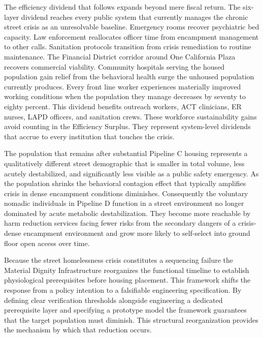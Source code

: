 \documentclass[12pt, letterpaper]{article}
\begin{document}
The efficiency dividend that follows expands beyond mere fiscal return. The six-layer dividend reaches every public system that currently manages the chronic street crisis as an unresolvable baseline. Emergency rooms recover psychiatric bed capacity. Law enforcement reallocates officer time from encampment management to other calls. Sanitation protocols transition from crisis remediation to routine maintenance. The Financial District corridor around One California Plaza recovers commercial viability. Community hospitals serving the housed population gain relief from the behavioral health surge the unhoused population currently produces. Every front line worker experiences materially improved working conditions when the population they manage decreases by seventy to eighty percent. This dividend benefits outreach workers, ACT clinicians, ER nurses, LAPD officers, and sanitation crews. These workforce sustainability gains avoid counting in the Efficiency Surplus. They represent system-level dividends that accrue to every institution that touches the crisis.

The population that remains after substantial Pipeline C housing represents a qualitatively different street demographic that is smaller in total volume, less acutely destabilized, and significantly less visible as a public safety emergency. As the population shrinks the behavioral contagion effect that typically amplifies crisis in dense encampment conditions diminishes. Consequently the voluntary nomadic individuals in Pipeline D function in a street environment no longer dominated by acute metabolic destabilization. They become more reachable by harm reduction services facing fewer risks from the secondary dangers of a crisis-dense encampment environment and grow more likely to self-select into ground floor open access over time.

Because the street homelessness crisis constitutes a sequencing failure the Material Dignity Infrastructure reorganizes the functional timeline to establish physiological prerequisites before housing placement. This framework shifts the response from a policy intention to a falsifiable engineering specification. By defining clear verification thresholds alongside engineering a dedicated prerequisite layer and specifying a prototype model the framework guarantees that the target population must diminish. This structural reorganization provides the mechanism by which that reduction occurs.

\clearpage
\raggedbottom
\appendix
{}
\let\oldparagraph\paragraph
\renewcommand{\paragraph}[1]{\needspace{3\baselineskip}\oldparagraph{#1}}
\let\paragraph\oldparagraph

\newpage
{}


\end{document}
